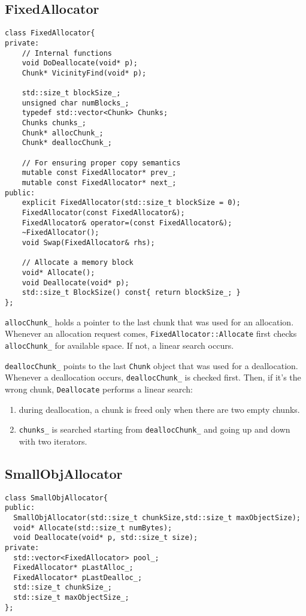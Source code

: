 \subsection{FixedAllocator}

\begin{verbatim}
class FixedAllocator{
private:
    // Internal functions        
    void DoDeallocate(void* p);
    Chunk* VicinityFind(void* p);

    std::size_t blockSize_;
    unsigned char numBlocks_;
    typedef std::vector<Chunk> Chunks;
    Chunks chunks_;
    Chunk* allocChunk_;
    Chunk* deallocChunk_;

    // For ensuring proper copy semantics
    mutable const FixedAllocator* prev_;
    mutable const FixedAllocator* next_;
public:
    explicit FixedAllocator(std::size_t blockSize = 0);
    FixedAllocator(const FixedAllocator&);
    FixedAllocator& operator=(const FixedAllocator&);
    ~FixedAllocator();
    void Swap(FixedAllocator& rhs);

    // Allocate a memory block
    void* Allocate();
    void Deallocate(void* p);
    std::size_t BlockSize() const{ return blockSize_; }
};
\end{verbatim}

\texttt{allocChunk\_} holds a pointer to the last chunk that was used
for an allocation. Whenever an allocation request comes,
\texttt{FixedAllocator::Allocate} first checks \texttt{allocChunk\_}
for available space. If not, a linear search occurs.

 \texttt{deallocChunk\_} points to the last \texttt{Chunk} object that
 was used for a deallocation. Whenever a deallocation occurs,
 \texttt{deallocChunk\_} is checked first. Then, if it's the wrong
 chunk, \texttt{Deallocate} performs a linear search:
 \begin{enumerate}
 \item during deallocation, a chunk is freed only when there are two
empty chunks.
\item \texttt{chunks\_} is searched starting from
  \texttt{deallocChunk\_} and going up and down with two iterators.
\end{enumerate}

\subsection{SmallObjAllocator}
\begin{verbatim}
class SmallObjAllocator{
public:
  SmallObjAllocator(std::size_t chunkSize,std::size_t maxObjectSize);
  void* Allocate(std::size_t numBytes);
  void Deallocate(void* p, std::size_t size);
private:
  std::vector<FixedAllocator> pool_;
  FixedAllocator* pLastAlloc_;
  FixedAllocator* pLastDealloc_;
  std::size_t chunkSize_;
  std::size_t maxObjectSize_;
};
\end{verbatim}

